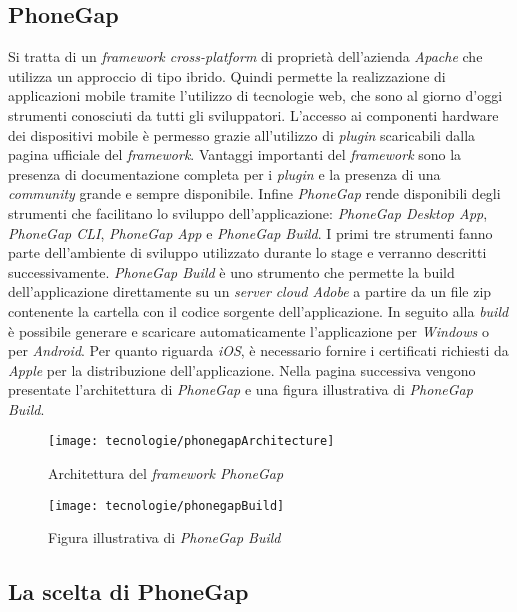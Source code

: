 \subsection{PhoneGap}

Si tratta di un \textit{framework cross-platform} di proprietà dell'azienda \textit{Apache} che utilizza un approccio di tipo ibrido. Quindi permette la realizzazione di applicazioni mobile tramite l'utilizzo di tecnologie web, che sono al giorno d'oggi strumenti conosciuti da tutti gli sviluppatori. L'accesso ai componenti hardware dei dispositivi mobile è permesso grazie all'utilizzo di \textit{plugin} scaricabili dalla pagina ufficiale del \textit{framework}. Vantaggi importanti del \textit{framework} sono la presenza di documentazione completa per i \textit{plugin} e la presenza di una \textit{community} grande e sempre disponibile. Infine \textit{PhoneGap} rende disponibili degli strumenti che facilitano lo sviluppo dell'applicazione: \textit{PhoneGap Desktop App}, \textit{PhoneGap CLI}, \textit{PhoneGap App} e \textit{PhoneGap Build}. I primi tre strumenti fanno parte dell'ambiente di sviluppo utilizzato durante lo stage e verranno descritti successivamente. \textit{PhoneGap Build} è uno strumento che permette la build dell'applicazione direttamente su un \textit{server} \textit{cloud Adobe} a partire da un file zip contenente la cartella con il codice sorgente dell'applicazione. In seguito alla \textit{build} è possibile generare e scaricare automaticamente l'applicazione per \textit{Windows} o per \textit{Android}. Per quanto riguarda \textit{iOS}, è necessario fornire i certificati richiesti da \textit{Apple} per la distribuzione dell'applicazione. Nella pagina successiva vengono presentate l'architettura di \textit{PhoneGap} e una figura illustrativa di \textit{PhoneGap Build}.

\begin{figure}[!h] 
    \centering 
    \texttt{[image: tecnologie/phonegapArchitecture]} 
    \caption{Architettura del \textit{framework PhoneGap}}
\end{figure}

\begin{figure}[!h] 
    \centering 
    \texttt{[image: tecnologie/phonegapBuild]} 
    \caption{Figura illustrativa di \textit{PhoneGap Build}}
\end{figure}

\newpage


\subsection{La scelta di PhoneGap}

